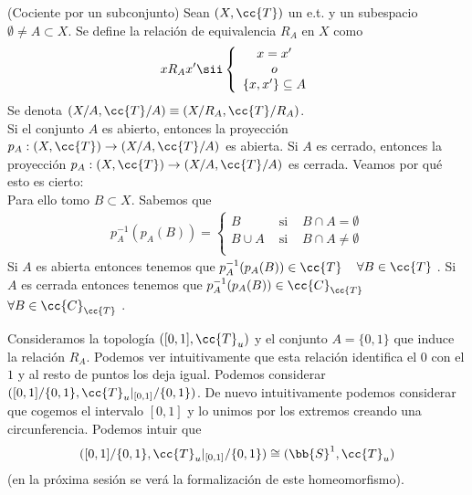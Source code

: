 \begin{ejemplo}(Cociente por un subconjunto)
    Sean $(X, \cc{T})$ un e.t. y un subespacio $\emptyset \neq A \subset X$. Se define la relación de equivalencia $R_A$ en $X$ como 
    \begin{align*}
        xR_A x' \sii \left\{
        \begin{array}{c}
            x=x'\\
            o\\
            \{x,x'\}\subseteq A\\
        \end{array}
        \right.
    \end{align*}
    Se denota $(X/A, \cc{T}/A)\equiv (X/R_A, \cc{T}/R_A)$.\\

    Si el conjunto $A$ es abierto, entonces la proyección $p_A:(X, \cc{T})\to (X/A, \cc{T}/A)$ es abierta. Si $A$ es cerrado, entonces la proyección $p_A:(X, \cc{T})\to (X/A, \cc{T}/A)$ es cerrada. Veamos por qué esto es cierto:\\

    Para ello tomo $B\subset X$. Sabemos que \begin{align*}
        p_A^{-1}(p_A(B)) = \left\{
            \begin{array}{ccc}
                B & \text{ si } & B\cap A = \emptyset\\
                B\cup A & \text{ si } & B\cap A \neq \emptyset\\
            \end{array}
            \right.
    \end{align*}
    Si $A$ es abierta entonces tenemos que $p_A^{-1}(p_A(B))\in \cc{T}$\ \ $\forall B \in \cc{T}$ . Si $A$ es cerrada entonces tenemos que $p_A^{-1}(p_A(B))\in \cc{C}_{\cc{T}}$\ \ $\forall B \in \cc{C}_{\cc{T}}$ . 
    \endsquare
\end{ejemplo}

\begin{ejemplo}
    Consideramos la topología $([0,1], \cc{T}_u)$ y el conjunto $A=\{0,1\}$ que induce la relación $R_A$. Podemos ver intuitivamente que esta relación identifica el $0$ con el $1$ y al resto de puntos los deja igual. Podemos considerar $([0,1]/\{0,1\}, \cc{T}_u|_{[0,1]}/\{0,1\})$. De nuevo intuitivamente podemos considerar que cogemos el intervalo $[0,1]$ y lo unimos por los extremos creando una circunferencia. Podemos intuir que
    \begin{align*}
        ([0,1]/\{0,1\}, \cc{T}_u|_{[0,1]}/\{0,1\}) \cong (\bb{S}^1, \cc{T}_u)
    \end{align*}
    (en la próxima sesión se verá la formalización de este homeomorfismo).
    \endsquare
\end{ejemplo}

